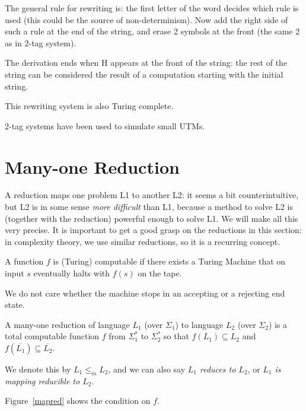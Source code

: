 The general rule for rewriting is: the first letter of the word
decides which rule is used (this could be the source of
non-determinism). Now add the right side of such a rule at the end of
the string, and erase 2 symbols at the front (the same 2 as in 2-tag
system).

The derivation ends when H appears at the front of the string: the
rest of the string can be considered the result of a computation
starting with the initial string.

This rewriting system is also Turing complete.


2-tag systems have been used to simulate small UTMs.


\section{Many-one Reduction}\label{mappingreduction}

A reduction maps one problem L1 to another L2: it seems a bit counterintuitive,
but L2 is in some sense {\em more difficult} than L1,
because a method to solve L2 is (together with the reduction) powerful
enough to solve L1. We will make all this very precise. It is important
to get a good grasp on the reductions in this section: in complexity
theory, we use similar reductions, so it is a recurring concept.

%

\begin{definition}
A function $f$ is (Turing)
       computable if there exists a Turing Machine that on input $s$
       eventually halts with $f(s)$ on the tape.
\end{definition}

We do not care whether the machine stops in an accepting or a
rejecting end state.

\begin{definition} \label{manyone}
A many-one reduction of language $L_1$ (over $\Sigma_1$) to language
$L_2$ (over $\Sigma_2$) is a total computable function $f$ from
$\Sigma_1^*$ to $\Sigma_2^*$ so that $f(L_1) \subseteq L_2$ and
%
$f(\overline{L_1}) \subseteq \overline{L_2}$.

We denote this by $L_1 \leq_m L_2$, and we can also say {\em $L_1$
  reduces to $L_2$}, or {\em $L_1$ is mapping reducible to $L_2$}.
\end{definition}

Figure~\ref{mapred} shows the condition on $f$.

